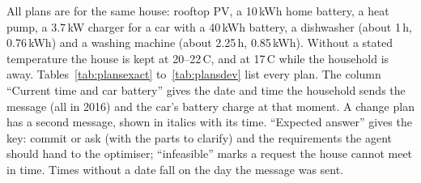All plans are for the same house: rooftop PV, a 10\,kWh home battery,
a heat pump, a 3.7\,kW charger for a car with a 40\,kWh battery, a
dishwasher (about 1\,h, 0.76\,kWh) and a washing machine (about
2.25\,h, 0.85\,kWh). Without a stated temperature the house is kept at
20--22\,\textdegree{}C, and at 17\,\textdegree{}C while the household is away.
Tables~\ref{tab:plansexact} to~\ref{tab:plansdev} list every plan. The
column ``Current time and car battery'' gives the date and time the
household sends the message (all in 2016) and the car's battery charge
at that moment. A change plan has a second
message, shown in italics with its time. ``Expected answer'' gives the
key: commit or ask (with the parts to clarify) and the requirements the
agent should hand to the optimiser; ``infeasible'' marks a request the
house cannot meet in time. Times without a date fall on the day the
message was sent.

